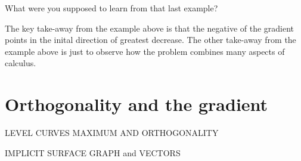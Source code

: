 \documentclass{ximera}
\begin{document}
\begin{question}
  What were you supposed to learn from that last example?
  \begin{prompt}
  \begin{multipleChoice}
  \end{multipleChoice}
  The key take-away from the example above is that the negative of the
  gradient points in the inital direction of greatest decrease. The
  other take-away from the example above is just to observe how the
  problem combines many aspects of calculus.
  \end{prompt}
\end{question}







\section{Orthogonality and the gradient}




    LEVEL CURVES MAXIMUM AND ORTHOGONALITY

    IMPLICIT SURFACE GRAPH and VECTORS
\end{document}
